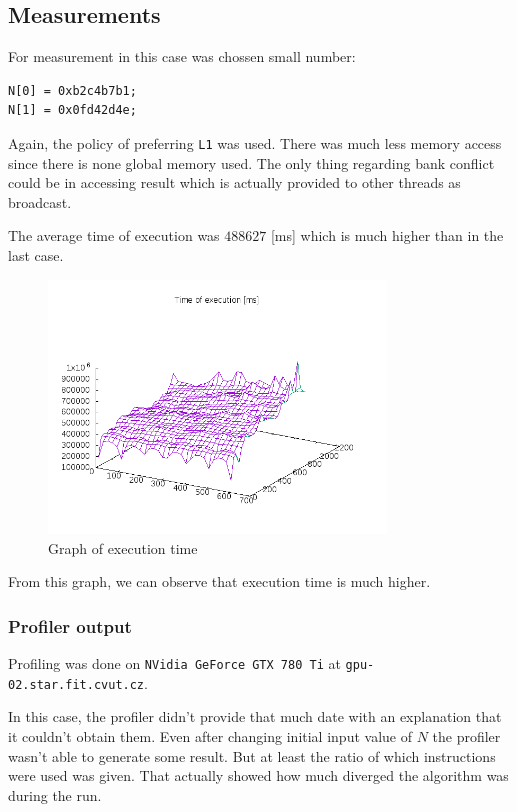 \documentclass[a4paper]{article}
\begin{document}
\subsection{Measurements}

For measurement in this case was chossen small number:

\begin{verbatim}
N[0] = 0xb2c4b7b1;
N[1] = 0x0fd42d4e;
\end{verbatim}

Again, the policy of preferring \texttt{L1} was used. There was much less memory access since there is none global memory used. The only thing regarding bank conflict could be in accessing result which is actually provided to other threads as broadcast.

The average time of execution was $488627$ [ms] which is much higher than in the last case.

\begin{figure}[H]
  \centering
    \includegraphics[width=0.8\textwidth]{graph_v2.png}
  \caption{Graph of execution time}
  \label{exec2}
\end{figure}

From this graph, we can observe that execution time is much higher.

\subsubsection{Profiler output}

Profiling was done on \texttt{NVidia GeForce GTX 780 Ti} at \texttt{gpu-02.star.fit.cvut.cz}.

In this case, the profiler didn't provide that much date with an explanation that it couldn't obtain them. Even after changing initial input value of $N$ the profiler wasn't able to generate some result. But at least the ratio of which instructions were used was given. That actually showed how much diverged the algorithm was during the run.
\end{document}
